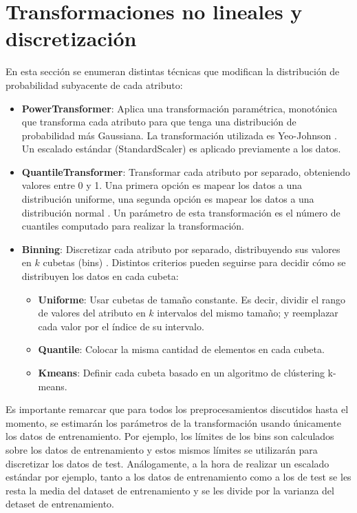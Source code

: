 \section { Transformaciones no lineales y discretización}

En esta sección se enumeran distintas técnicas que modifican la distribución de probabilidad subyacente de cada atributo:

\begin{itemize}

\item \textbf{PowerTransformer}: Aplica una transformación paramétrica, monotónica que transforma cada atributo para que tenga una distribución de probabilidad más Gaussiana. La transformación utilizada es  Yeo-Johnson \cite{yeo}. Un escalado estándar (StandardScaler) es aplicado previamente a los datos.

\item \textbf {QuantileTransformer}: Transformar cada atributo por separado, obteniendo valores entre 0 y 1. Una primera opción es mapear los datos a una distribución uniforme, una segunda opción es mapear los datos a una distribución normal \cite{KRZYSZTOFOWICZ1997286}. Un parámetro de esta transformación es el número de cuantiles computado para realizar la transformación.

\item \textbf {Binning}: Discretizar cada atributo por separado, distribuyendo sus valores en $k$ cubetas (bins) \cite{han2012mining}. Distintos criterios pueden seguirse para decidir cómo se distribuyen los datos en cada cubeta:
\begin{itemize}
\item \textbf{Uniforme}: Usar cubetas de tamaño constante. Es decir, dividir el rango de valores del atributo en $k$ intervalos del mismo tamaño; y reemplazar cada valor por el índice de su intervalo.
\item \textbf{Quantile}: Colocar la misma cantidad de elementos en cada cubeta.
\item \textbf{Kmeans}: Definir cada cubeta basado en un algoritmo de clústering k-means. 
\end{itemize}
\end{itemize}


Es importante remarcar que para todos los preprocesamientos discutidos hasta el momento, se estimarán los parámetros de la transformación usando únicamente los datos de entrenamiento. Por ejemplo, los límites de los bins son calculados sobre los datos de entrenamiento y estos mismos límites se utilizarán para discretizar los datos de test. Análogamente, a la hora de realizar un escalado estándar por ejemplo, tanto a los datos de entrenamiento como a los de test se les resta la media del dataset de entrenamiento y se les divide por la varianza del detaset de entrenamiento.

